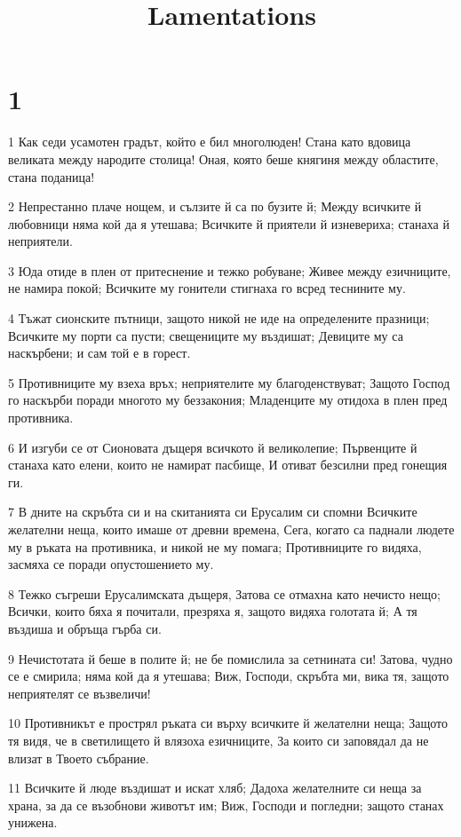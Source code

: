 

\title{Lamentations}


\chapter{1}

\par 1 Как седи усамотен градът, който е бил многолюден! Стана като вдовица великата между народите столица! Оная, която беше княгиня между областите, стана поданица!
\par 2 Непрестанно плаче нощем, и сълзите й са по бузите й; Между всичките й любовници няма кой да я утешава; Всичките й приятели й изневериха; станаха й неприятели.
\par 3 Юда отиде в плен от притеснение и тежко робуване; Живее между езичниците, не намира покой; Всичките му гонители стигнаха го всред теснините му.
\par 4 Тъжат сионските пътници, защото никой не иде на определените празници; Всичките му порти са пусти; свещениците му въздишат; Девиците му са наскърбени; и сам той е в горест.
\par 5 Противниците му взеха връх; неприятелите му благоденствуват; Защото Господ го наскърби поради многото му беззакония; Младенците му отидоха в плен пред противника.
\par 6 И изгуби се от Сионовата дъщеря всичкото й великолепие; Първенците й станаха като елени, които не намират пасбище, И отиват безсилни пред гонещия ги.
\par 7 В дните на скръбта си и на скитанията си Ерусалим си спомни Всичките желателни неща, които имаше от древни времена, Сега, когато са паднали людете му в ръката на противника, и никой не му помага; Противниците го видяха, засмяха се поради опустошението му.
\par 8 Тежко съгреши Ерусалимската дъщеря, Затова се отмахна като нечисто нещо; Всички, които бяха я почитали, презряха я, защото видяха голотата й; А тя въздиша и обръща гърба си.
\par 9 Нечистотата й беше в полите й; не бе помислила за сетнината си! Затова, чудно се е смирила; няма кой да я утешава; Виж, Господи, скръбта ми, вика тя, защото неприятелят се възвеличи!
\par 10 Противникът е прострял ръката си върху всичките й желателни неща; Защото тя видя, че в светилището й влязоха езичниците, За които си заповядал да не влизат в Твоето събрание.
\par 11 Всичките й люде въздишат и искат хляб; Дадоха желателните си неща за храна, за да се възобнови животът им; Виж, Господи и погледни; защото станах унижена.
